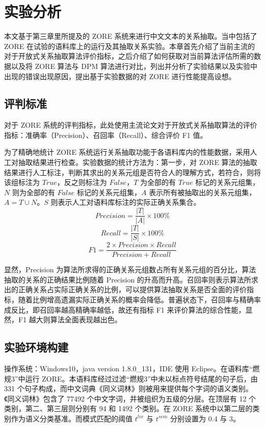 \chapter{实验分析}
本文基于第三章里所提及的 ZORE 系统来进行中文文本的关系抽取。当中包括了 ZORE 在试验的语料库上的运行及其抽取关系实验。本章首先介绍了当前主流的对于开放式关系抽取算法评价指标，之后介绍了如何获取对当前算法评估所需的数据以及将 ZORE 算法与 DPM 算法进行对比，列出并分析了实验结果以及实验中出现的错误出现原因，提出基于实验数据的对 ZORE 进行性能提高设想。
\section{评判标准}对于 ZORE 系统的评判指标，此处使用主流论文对于开放式关系抽取算法的评价指标：准确率（Precision）、召回率（Recall）、综合评价 F1 值。

为了精确地统计 ZORE 系统运行关系抽取功能于各语料库内的性能数据，采用人工对抽取结果进行检查。实验数据的统计方法为：第一步，对 ZORE 算法的抽取结果进行人工标注，判断其求出的关系元组是否符合人的理解方式，若符合，则将该组标注为 $True$，反之则标注为 $False$，$T$ 为全部的有 $True$ 标记的关系元组集，$N$ 则为全部的有 $False$ 标记的关系元组集，$A$ 表示所有被抽取出的关系元组集，$A=T\cup N$。$S$ 则表示人工对语料库标注的实际正确关系集合。
    \begin{equation}
        Precision=\frac{|T|}{|A|}\times 100\%
    \end{equation}
    \begin{equation}
        Recall=\frac{|T|}{|S|}\times 100\%
    \end{equation}
    \begin{equation}
        F1=\frac{2\times Precision\times Recall}{Precision+Recall}
    \end{equation}

显然，Precision 为算法所求得的正确关系元组数占所有关系元组的百分比，算法抽取的关系的正确结果比例随着 Precision 的升高而升高。召回率则表示算法所求出的正确关系占实际正确关系的比例，可以提供算法抽取关系是否全面的评价指标，随着比例增高遗漏实际正确关系的概率会降低。普遍状态下，召回率与精确率成反比，即召回率越高精确率越低，故还有指标 F1 来评价算法的综合性能，显然，F1 越大则算法全面表现越出色。

\section{实验环境构建}
操作系统：Windows10，java version 1.8.0\_131，IDE 使用 Eclipse。在语料库“燃规3”中运行 ZORE。本语料库经过过滤“燃规3”中未以标点符号结尾的句子后，由 331 个句子构成，而中文词典《同义词林》\citep{che2005}则被用来提供每个字词的语义类别。《同义词林》包含了 77492 个中文字词，并被组织为五级的分层。在顶层有 12 个类别，第二、第三层则分别有 94 和 1492 个类别。在 ZORE 系统中以第二层的类别作为语义分类基准。而模式匹配的阈值 $t^{lvc}$ 与 $t^{sem}$ 分别设置为 0.4 与 3。

